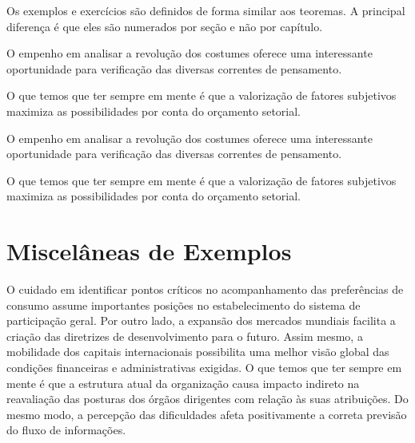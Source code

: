\documentclass[fleqn]{icat-ufal}
\begin{document}
Os exemplos e exercícios são definidos de forma similar aos teoremas.
A principal diferença é que eles são numerados por seção e não por capítulo.

\begin{exemplo}
    O empenho em analisar a revolução dos costumes oferece uma interessante
    oportunidade para verificação das diversas correntes de pensamento. 
\end{exemplo}

\begin{exercicio}
    O que temos que ter sempre em mente é que a valorização de fatores subjetivos
    maximiza as possibilidades por conta do orçamento setorial.
\end{exercicio}

\begin{exemplo}
    O empenho em analisar a revolução dos costumes oferece uma interessante
    oportunidade para verificação das diversas correntes de pensamento. 
\end{exemplo}

\begin{exercicio}
    O que temos que ter sempre em mente é que a valorização de fatores subjetivos
    maximiza as possibilidades por conta do orçamento setorial.
\end{exercicio}

\chapter{Miscelâneas de Exemplos}
\label{cap:misselaneas_de_exemplos}

O cuidado em identificar pontos críticos no acompanhamento das preferências de
consumo assume importantes posições no estabelecimento do sistema de
participação geral. Por outro lado, a expansão dos mercados mundiais facilita a
criação das diretrizes de desenvolvimento para o futuro. Assim mesmo, a
mobilidade dos capitais internacionais possibilita uma melhor visão global das
condições financeiras e administrativas exigidas. O que temos que ter sempre em
mente é que a estrutura atual da organização causa impacto indireto na
reavaliação das posturas dos órgãos dirigentes com relação às suas atribuições.
Do mesmo modo, a percepção das dificuldades afeta positivamente a correta
previsão do fluxo de informações. 
\end{document}
